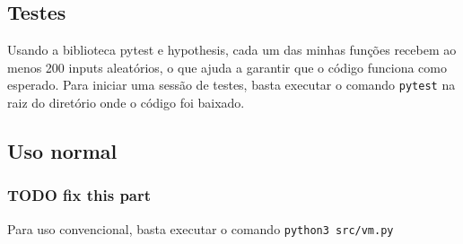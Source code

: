 \documentclass[11pt]{article}
\begin{document}
\subsection{Testes}
\label{sec:org97d2ad2}
Usando a biblioteca pytest e hypothesis, cada um das minhas funções recebem ao
menos 200 inputs aleatórios, o que ajuda a garantir que o código funciona como
esperado. Para iniciar uma sessão de testes, basta executar o comando \texttt{pytest} na raiz do diretório onde o código foi baixado.
\subsection{Uso normal}
\label{sec:orgdce4ea4}
\subsubsection{{\bfseries\sffamily TODO} fix this part}
\label{sec:org860afa3}
Para uso convencional, basta executar o comando
\texttt{python3 src/vm.py}
\end{document}
